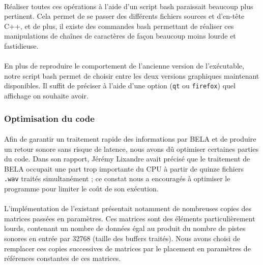 \paragraph{}
Réaliser toutes ces opérations à l'aide d'un script bash paraissait
beaucoup plus pertinent. Cela permet de se passer des différents
fichiers sources et d'en-tête C++, et de plus, il existe des commandes
bash permettant de réaliser ces manipulations de chaînes de caractères
de façon beaucoup moins lourde et fastidieuse.
\paragraph{}
En plus de reproduire le comportement de l'ancienne version de
l'exécutable, notre script bash permet de choisir entre les deux
versions graphiques maintenant disponibles. Il suffit de préciser à
l'aide d'une option (\verb!qt! ou \verb!firefox!) quel affichage on
souhaite avoir.

\subsubsection{Optimisation du code}
\paragraph{}
Afin de garantir un traitement rapide des informations par BELA et de
produire un retour sonore sans risque de latence, nous avons dû
optimiser certaines parties du code. Dans son rapport, Jérémy Lixandre
avait précisé que le traitement de BELA occupait une part trop
importante du CPU à partir de quinze fichiers \verb!.wav! traités
simultanément ; ce constat nous a encouragés à optimiser le programme
pour limiter le coût de son exécution.
\paragraph{}
L'implémentation de l'existant présentait notamment de nombreuses
copies des matrices passées en paramètres. Ces matrices sont des
éléments particulièrement lourds, contenant un nombre de données égal
au produit du nombre de pistes sonores en entrée par 32768 (taille des
buffers traités). Nous avons choisi de remplacer ces copies
successives de matrices par le placement en paramètres de références
constantes de ces matrices.

